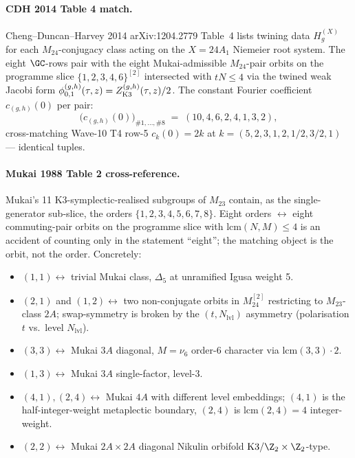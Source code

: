 \paragraph{CDH 2014 Table 4 match.}\ClaimStatusTheorem{}
Cheng--Duncan--Harvey 2014 arXiv:1204.2779 Table~4 lists twining
data $H^{(X)}_g$ for each $M_{24}$-conjugacy class acting on the
$X = 24A_1$ Niemeier root system.  The eight $\GC$-rows pair with
the eight Mukai-admissible $M_{24}$-pair orbits on the programme
slice $\{1,2,3,4,6\}^{[2]}$ intersected with $tN \le 4$ via the
twined weak Jacobi form
$\phi^{(g,h)}_{0,1}(\tau, z) = Z^{(g,h)}_{\mathrm{K3}}(\tau, z)/2$.
The constant Fourier coefficient $c_{(g,h)}(0)$ per pair:
\[
  \bigl(c_{(g,h)}(0)\bigr)_{\#1,\ldots,\#8}
  \;=\; (10, 4, 6, 2, 4, 1, 3, 2),
\]
cross-matching Wave-10 T4 row-5 $c_k(0) = 2k$ at
$k = (5, 2, 3, 1, 2, 1/2, 3/2, 1)$ --- identical tuples.

\paragraph{Mukai 1988 Table 2 cross-reference.}\ClaimStatusTheorem{}
Mukai's 11 K3-symplectic-realised subgroups of $M_{23}$ contain, as
the single-generator sub-slice, the orders $\{1, 2, 3, 4, 5, 6, 7, 8\}$.
Eight orders $\leftrightarrow$ eight commuting-pair orbits on the
programme slice with $\mathrm{lcm}(N, M) \le 4$ is an accident of
counting only in the statement ``eight''; the matching object is the
orbit, not the order.  Concretely:
\begin{itemize}
\itemsep 1pt
\item $(1, 1) \leftrightarrow$ trivial Mukai class, $\Delta_5$
  at unramified Igusa weight 5.
\item $(2, 1)$ and $(1, 2) \leftrightarrow$ two non-conjugate
  orbits in $M_{24}^{[2]}$ restricting to $M_{23}$-class $2A$;
  swap-symmetry is broken by the $(t, N_{\mathrm{lvl}})$ asymmetry
  (polarisation $t$ vs.~level $N_{\mathrm{lvl}}$).
\item $(3, 3) \leftrightarrow$ Mukai $3A$ diagonal, $M = \nu_6$
  order-$6$ character via $\mathrm{lcm}(3,3)\cdot 2$.
\item $(1, 3)\leftrightarrow$ Mukai $3A$ single-factor, level-$3$.
\item $(4, 1), (2, 4) \leftrightarrow$ Mukai $4A$ with different
  level embeddings; $(4, 1)$ is the half-integer-weight metaplectic
  boundary, $(2, 4)$ is $\mathrm{lcm}(2, 4) = 4$ integer-weight.
\item $(2, 2) \leftrightarrow$ Mukai $2A \times 2A$ diagonal
  Nikulin orbifold $\K/\Z_2 \times \Z_2$-type.
\end{itemize}

